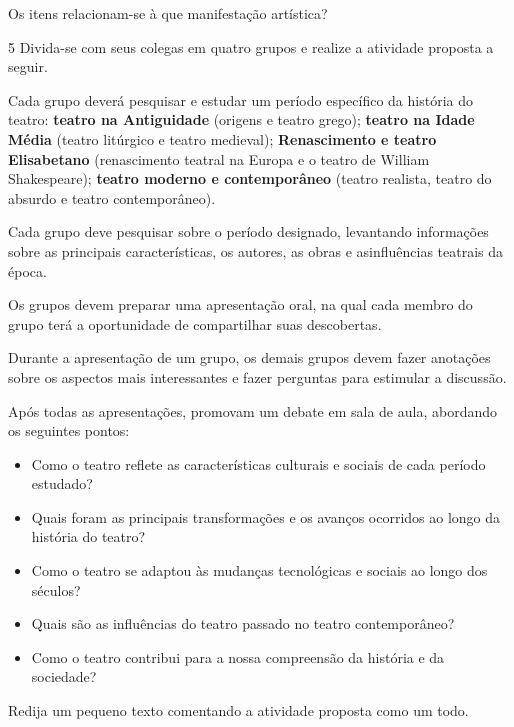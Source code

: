 Os itens relacionam-se à que manifestação artística?


\num{5} Divida-se com seus colegas em quatro grupos e realize a atividade proposta a seguir.

\begin{escolha}
  \item Cada grupo deverá pesquisar e estudar um período específico da história do teatro: \textbf{teatro na Antiguidade} (origens e teatro grego); \textbf{teatro na Idade Média} (teatro litúrgico e teatro medieval); \textbf{Renascimento e teatro Elisabetano} (renascimento teatral na Europa e o teatro de William Shakespeare); \textbf{teatro moderno e contemporâneo} (teatro realista, teatro do absurdo e teatro contemporâneo).
  \item Cada grupo deve pesquisar sobre o período designado, levantando informações sobre as principais características, os autores, as obras e asinfluências teatrais da época.
  \item Os grupos devem preparar uma apresentação oral, na qual cada membro do grupo terá a oportunidade de compartilhar suas descobertas.
  \item Durante a apresentação de um grupo, os demais grupos devem fazer anotações sobre os aspectos mais interessantes e fazer perguntas para estimular a discussão.
\end{escolha}

Após todas as apresentações, promovam um debate em sala de aula, abordando os seguintes pontos:

\begin{itemize}
  \item Como o teatro reflete as características culturais e sociais de cada período estudado?
  \item Quais foram as principais transformações e os avanços ocorridos ao longo da história do teatro?
  \item Como o teatro se adaptou às mudanças tecnológicas e sociais ao longo dos séculos?
  \item Quais são as influências do teatro passado no teatro contemporâneo?
  \item Como o teatro contribui para a nossa compreensão da história e da sociedade?
\end{itemize}

Redija um pequeno texto comentando a atividade proposta como um todo.

